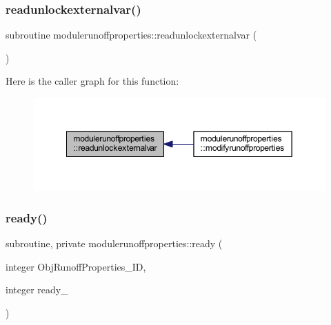 \subsubsection{\texorpdfstring{readunlockexternalvar()}{readunlockexternalvar()}}
{\footnotesize\ttfamily subroutine modulerunoffproperties\+::readunlockexternalvar (\begin{DoxyParamCaption}{ }\end{DoxyParamCaption})\hspace{0.3cm}{\ttfamily [private]}}

Here is the caller graph for this function\+:\nopagebreak
\begin{figure}[H]
\begin{center}
\leavevmode
\includegraphics[width=349pt]{namespacemodulerunoffproperties_abc9cf8901e71a0c3d3b26dd7b5414361_icgraph}
\end{center}
\end{figure}
\mbox{\label{namespacemodulerunoffproperties_a8d87a5f2a053e30ef829a92665e19d06}} 
\subsubsection{\texorpdfstring{ready()}{ready()}}
{\footnotesize\ttfamily subroutine, private modulerunoffproperties\+::ready (\begin{DoxyParamCaption}\item[{integer}]{Obj\+Runoff\+Properties\+\_\+\+ID,  }\item[{integer}]{ready\+\_\+ }\end{DoxyParamCaption})\hspace{0.3cm}{\ttfamily [private]}}

